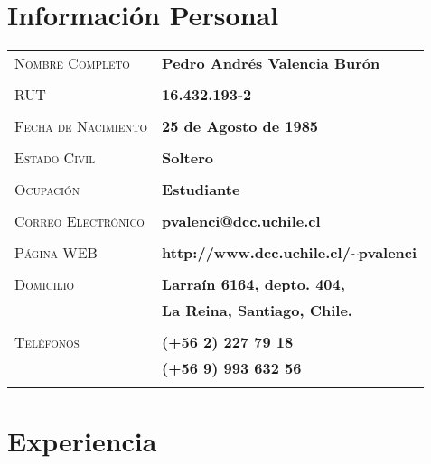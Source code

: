 \documentclass[letterpaper, oneside, final, 12pt]{scrartcl}
\newcommand{\gray}{\rowcolor[gray]{.90}}
\begin{document}
\begin{center}
\textsc{\Huge{}}

\section{Informaci\'on Personal}

\begin{tabularx}{0.97\linewidth}{>{\raggedleft\scshape}p{5cm}X}

\gray	Nombre Completo		& \textbf{Pedro Andr\'es Valencia Bur\'on} \\
	& \\
\gray	RUT					& \textbf{16.432.193-2} \\
	& \\
\gray	Fecha de Nacimiento & \textbf{25 de Agosto de 1985} \\	
	& \\
\gray	Estado Civil 		& \textbf{Soltero} \\
	& \\
\gray	Ocupaci\'on 		& \textbf{Estudiante} \\
	& \\
\gray	Correo Electr\'onico	& \textbf{pvalenci@dcc.uchile.cl} \\
	& \\
\gray	P\'agina WEB			& \textbf{http://www.dcc.uchile.cl/\~{}pvalenci} \\
	& \\
\gray	Domicilio			& \textbf{Larra\'in 6164, depto. 404,} \\
\gray						& \textbf{La Reina, Santiago, Chile.} \\
	& \\
\gray	Tel\'efonos			& \textbf{(+56 2) 227 79 18} \\
\gray						& \textbf{(+56 9) 993 632 56} \\
	& \\

\end{tabularx}

\section{Experiencia}


\end{center}
\end{document}
